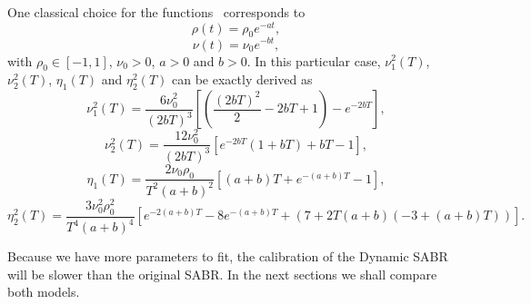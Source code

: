 One classical choice for the functions~\cite{Fernandez} corresponds to
\begin{equation}
\rho(t)=\rho_0e^{-at},
\end{equation}
\begin{equation}
\nu(t)=\nu_0e^{-bt},
\end{equation}
\noindent with $\rho_0\in[-1,1]$, $\nu_0>0$, $a>0$ and $b>0$.
In this particular case, $\nu_1^2(T)$, $\nu_2^2(T)$, $\eta_1(T)$ and $\eta_2^2(T)$ can be exactly derived as
\begin{equation}
\nu_1^2(T)=\frac{6\nu_0^2}{(2bT)^3}\left[\left(\frac{(2bT)^2}{2}-2bT+1\right)-e^{-2bT}\right],
\end{equation}
\begin{equation}
\nu_2^2(T)=\frac{12\nu_0^2}{(2bT)^3}\left[e^{-2bT}(1+bT)+bT-1\right],
\end{equation}
\begin{equation}
\eta_1(T)=\frac{2\nu_0\rho_0}{T^2(a+b)^2}\left[(a+b)T+e^{-(a+b)T}-1\right],
\end{equation}
\begin{equation}
\eta_2^2(T)=\frac{3\nu_0^2\rho_0^2}{T^4(a+b)^4}\left[e^{-2(a+b)T}-8e^{-(a+b)T}+(7+2T(a+b)(-3+(a+b)T))\right].
\end{equation}

Because we have more parameters to fit, the calibration of the Dynamic SABR will be slower than the original SABR. In the next sections we shall compare both models.